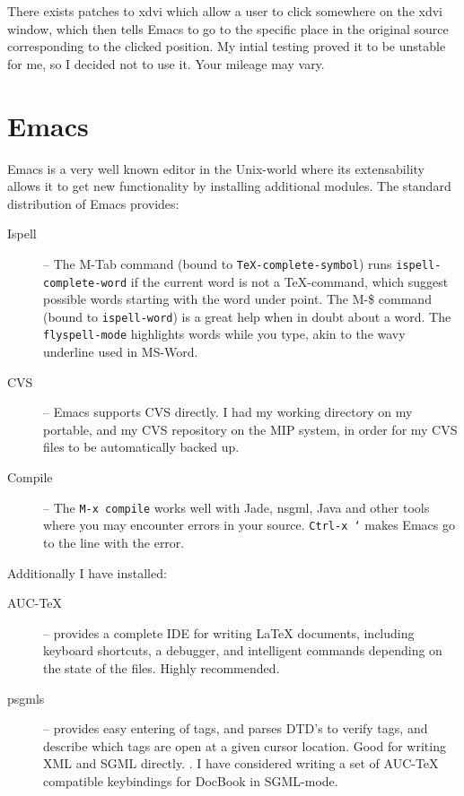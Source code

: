 There exists patches to xdvi which allow a user to click somewhere on
the xdvi window, which then tells Emacs to go to the specific place in
the original source corresponding to the clicked position.  My intial
testing proved it to be unstable for me, so I decided not to use it.
Your mileage may vary.



\section{Emacs} 
\label{sec:report-writing-tools-emacs} 


Emacs is a very well known editor in the Unix-world where its
extensability allows it to get new functionality by installing
additional modules.  The standard distribution of Emacs provides:

\begin{description}
\item[Ispell] -- The M-Tab command (bound to
  \texttt{TeX-complete-symbol}) runs \texttt{ispell-complete-word} if
  the current word is not a {\TeX}-command, which suggest possible
  words starting with the word under point.  The M-\$ command (bound
  to \texttt{ispell-word}) is a great help when in doubt about a
  word.  The \texttt{flyspell-mode} highlights words while you type,
  akin to the wavy underline used in MS-Word. 

\item[CVS] -- Emacs supports CVS directly.  I
  had my working directory on my portable, and my CVS repository on
  the MIP system, in order for my CVS files to be automatically backed
  up. 
\item[Compile] -- The \texttt{M-x compile} works well with Jade,
  nsgml, Java and other tools where you may encounter errors in your
  source.  \texttt{Ctrl-x `} makes Emacs go to the line with the
  error.
  
\end{description}

Additionally I have installed:


\begin{description}
\item[AUC-TeX] -- provides a complete IDE for writing {\LaTeX}
  documents, including keyboard shortcuts, a debugger, and intelligent
  commands depending on the state of the files. Highly recommended.
\item[psgmls] -- provides easy entering of tags, and parses DTD's to
  verify tags, and describe which tags are open at a given cursor
  location.  Good for writing XML and SGML directly.
  .  I have considered writing a set of AUC-TeX
  compatible keybindings for DocBook in SGML-mode.
\end{description}



